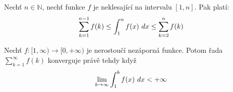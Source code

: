 \begin{theorem}
	Nechť $n \in \mathbb{N}$, nechť funkce $f$ je neklesající na intervalu $[1, n]$.
	Pak platí:
	$$\sum_{k = 1}^{n-1} f(k) \leq \int_{1}^{n} f(x) \ dx \leq \sum_{k = 2}^{n} f(k)$$
	\label{thm:odhad_souctu_integralem}
\end{theorem}

\begin{theorem}
	Nechť $f \colon [1, \infty) \rightarrow [0, +\infty)$ je nerostoučí nezáporná funkce.
	Potom řada $\sum_{k = 1}^{\infty} f(k)$ konverguje právě tehdy když
	$$\lim_{b \rightarrow \infty} \int_{1}^{b} f(x) \ dx < +\infty$$
	\label{thm:integralni_kriterium_konvergence}
\end{theorem}

